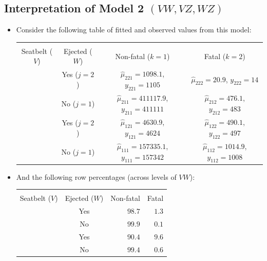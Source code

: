 \documentclass{article}\usepackage[]{graphicx}\usepackage[svgnames]{xcolor}
\begin{document}
\subsection*{Interpretation of Model 2 $(VW , VZ , WZ )$}
\begin{itemize}
    \item Consider the following table of fitted and observed values from this model:
          \begin{table}[H]
              \centering
              \begin{NiceTabular}{cccc}
                  \toprule
                  &                 &            \\
                  Seatbelt ($ V $) & Ejected ($ W $) & Non-fatal ($ k=1 $) & Fatal ($ k=2 $)          \\
                  \midrule
                   & Yes  ($ j=2 $) & $ \hat{\mu}_{221}=1098.1 $, $y_{221}=1105 $ & $ \hat{\mu}_{222}=20.9 $, $ y_{222}=14 $\\
                  & No  ($ j=1 $) & $ \hat{\mu}_{211}=411117.9 $, $ y_{211}=411111 $ & $ \hat{\mu}_{212}=476.1 $, $ y_{212}=483 $\\
                   & Yes ($ j=2 $) & $ \hat{\mu}_{121}=4630.9 $, $ y_{121}=4624 $ & $ \hat{\mu}_{122}=490.1 $, $ y_{122}=497 $\\
                  & No ($ j=1 $) & $ \hat{\mu}_{111}=157335.1 $, $ y_{111}=157342 $ & $ \hat{\mu}_{112}=1014.9 $, $ y_{112}=1008 $\\
                  \bottomrule
              \end{NiceTabular}
          \end{table}
    \item And the following row percentages (across levels of $ VW $):
          \begin{table}[H]
              \centering
              \begin{NiceTabular}{ccrr}
                  \toprule
                  &                 &            \\
                  Seatbelt ($ V $) & Ejected ($ W $) & Non-fatal & Fatal          \\
                  \midrule
                   & Yes & $ 98.7 $ & $ 1.3 $\\
                  & No & $ 99.9 $ & $ 0.1 $\\
                   & Yes & $ 90.4 $ & $ 9.6 $\\
                  & No & $ 99.4 $ & $ 0.6 $\\
                  \bottomrule
              \end{NiceTabular}
          \end{table}
\end{itemize}
\end{document}
